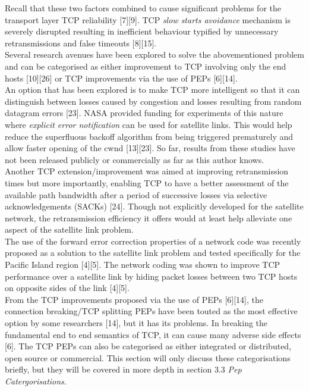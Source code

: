 \documentclass{uathesis}
\begin{document}
Recall that these two factors combined to cause significant problems for the transport layer TCP reliability [7][9]. TCP \emph{slow starts avoidance} mechanism is severely disrupted resulting in inefficient behaviour typified by unnecessary retransmissions and false timeouts [8][15]. \\

Several research avenues have been explored to solve the abovementioned problem and can be categorised as either improvement to TCP involving only the end hosts [10][26] or TCP improvements via the use of PEPs [6][14]. \\

An option that has been explored is to make TCP more intelligent so that it can distinguish between losses caused by congestion and losses resulting from random datagram errors [23]. NASA provided funding for experiments of this nature where \emph{explicit error notification} can be used for satellite links. This would help reduce the superfluous backoff algorithm from being triggered prematurely and allow faster opening of the cwnd [13][23]. So far, results from these studies have not been released publicly or commercially as far as this author knows. \\

Another TCP extension/improvement was aimed at improving retransmission times but more importantly, enabling TCP to have a better assessment of the available path bandwidth after a period of successive losses via selective acknowledgements (SACKs) [24]. Though not explicitly developed for the satellite network, the retransmission efficiency it offers would at least help alleviate one aspect of the satellite link problem.\\

The use of the forward error correction properties of a network code was recently proposed as a solution to the satellite link problem and tested specifically for the Pacific Island region [4][5]. The network coding was shown to improve TCP performance over a satellite link by hiding packet losses between two TCP hosts on opposite sides of the link [4][5].\\

From the TCP improvements proposed via the use of PEPs [6][14], the connection breaking/TCP splitting PEPs have been touted as the most effective option by some researchers [14], but it has its problems. In breaking the fundamental end to end semantics of TCP, it can cause many adverse side effects [6]. The TCP PEPs can also be categorised as either integrated or distributed, open source or commercial. This section will only discuss these categorisations briefly, but they will be covered in more depth in section 3.3 \emph{Pep Catergorisations}.\\
\end{document}
